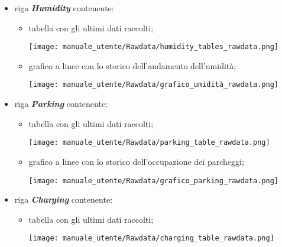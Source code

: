 \begin{itemize}
\begin{itemize}
    \end{itemize}
    \item riga \textit{\textbf{Humidity}} contenente:
    \begin{itemize}
        \item tabella con gli ultimi dati raccolti;
        \begin{center}
            \texttt{[image: manuale\_utente/Rawdata/humidity\_tables\_rawdata.png]}
        \end{center}
        \item grafico a linee con lo storico dell'andamento dell'umidità;
        \begin{center}
            \texttt{[image: manuale\_utente/Rawdata/grafico\_umidità\_rawdata.png]}
        \end{center}
    \end{itemize}
    \item riga \textit{\textbf{Parking}} contenente:
    \begin{itemize}
        \item tabella con gli ultimi dati raccolti;
        \begin{center}
            \texttt{[image: manuale\_utente/Rawdata/parking\_table\_rawdata.png]}
        \end{center}
        \item grafico a linee con lo storico dell'occupazione dei parcheggi;
        \begin{center}
            \texttt{[image: manuale\_utente/Rawdata/grafico\_parking\_rawdata.png]}
        \end{center}
    \end{itemize}
    \item riga \textit{\textbf{Charging}} contenente:
    \begin{itemize}
        \item tabella con gli ultimi dati raccolti;
        \begin{center}
            \texttt{[image: manuale\_utente/Rawdata/charging\_table\_rawdata.png]}
        \end{center}

\end{itemize}
\end{itemize}
